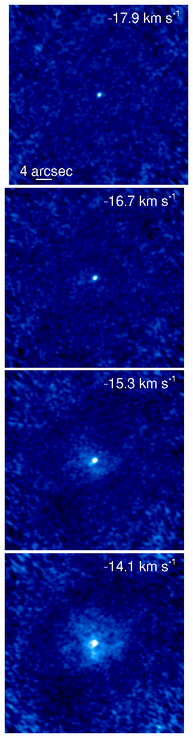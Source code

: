 \documentclass[preprint2]{aastex}
\begin{document}
\begin{figure}[hbt!]
\mbox{
          \includegraphics[]{chan41.ps}
          \includegraphics[]{chan40.ps}
          \includegraphics[]{chan39.ps}
          \includegraphics[]{chan38.ps}
}
\end{figure}
\end{document}
